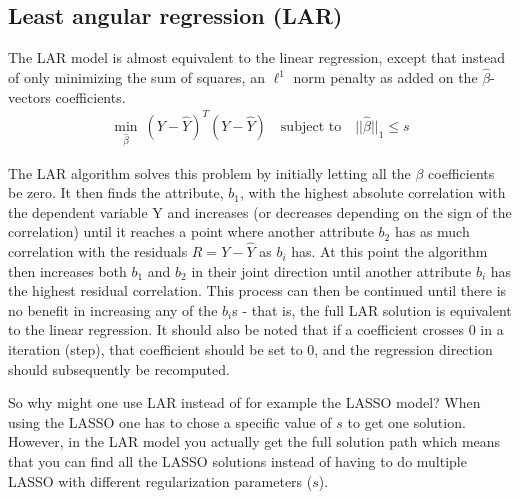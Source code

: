 \subsection{Least angular regression (LAR)}
The LAR model is almost equivalent to the linear regression, except that instead of only minimizing the sum of squares, an $\ell^1$ norm penalty as added on the $\hat{\beta}$-vectors coefficients.
\begin{align}
\min_{\hat{\beta}}\ (Y - \hat{Y})^T (Y - \hat{Y}) \quad \text{subject to} \quad ||\hat{\beta}||_1 \le s
\end{align}

The LAR algorithm \cite{LAR-algorithm} solves this problem by initially letting all the $\beta$ coefficients be zero.
It then finds the attribute, $b_1$, with the highest absolute correlation with the dependent variable Y and increases  (or decreases depending on the sign of the correlation)
until it reaches a point where another attribute $b_2$ has as much  correlation with the residuals $R=Y-\hat{Y}$ as  $b_i$ has.
At this point the algorithm then increases both $b_1$ and $b_2$ in their joint direction until another attribute $b_i$ has the highest residual correlation.
This process can then be continued until there is no benefit in increasing any of the $b_i$s - that is, the full LAR solution is equivalent to the linear regression.
It should also be noted that if a coefficient crosses 0 in a iteration (step),
that coefficient should be set to 0, and the regression direction  should subsequently be recomputed.

So why might one use LAR instead of for example the LASSO model? 
When using the LASSO one has to chose a specific value of $s$ to get one solution.
However, in the LAR model you actually get the full solution path which means that you can find all the LASSO solutions instead of having to do multiple LASSO with different regularization parameters ($s$).
